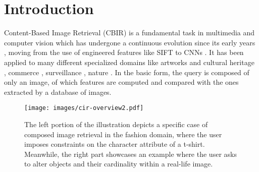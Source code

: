 \documentclass[acmlarge]{acmart}
\begin{document}

\maketitle








\section{Introduction}\label{sec:intro}
Content-Based Image Retrieval (CBIR) is a fundamental task in multimedia and computer vision which has undergone a continuous evolution since its early years \cite{smeulders2000content}, moving from the use of engineered features like SIFT to CNNs \cite{zheng2017sift,LI2021675}. It has been applied to many different specialized domains like artworks and cultural heritage \cite{yildirim2018mobile, baldrati2022exploiting}, commerce \cite{Zhan_2021_ICCV, dong2021m5product}, surveillance \cite{ahmad2018object}, nature \cite{ionescu2019imageclef, ionescu2020imageclef}.
In the basic form, the query is composed of only an image, of which features are computed and compared with the ones extracted by a database of images.


\begin{figure}[!tbh]
    \centering
    \texttt{[image: images/cir-overview2.pdf]}
    \caption{The left portion of the illustration depicts a specific case of composed image retrieval in the fashion domain, where the user imposes constraints on the character attribute of a t-shirt. Meanwhile, the right part showcases an example where the user asks to alter objects and their cardinality within a real-life image.}
    \label{fig:cir-overview}
    \vspace{-2ex}
\end{figure}
\end{document}
